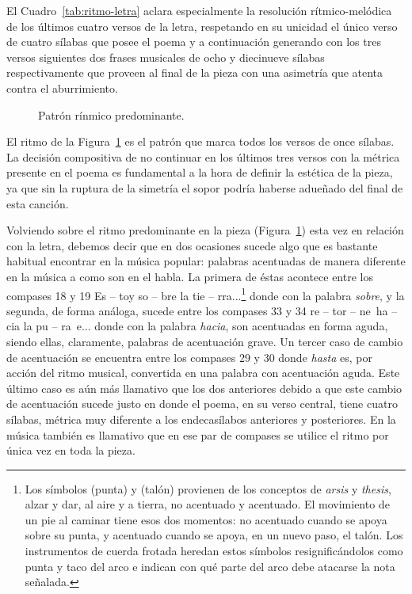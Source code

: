 El Cuadro~\ref{tab:ritmo-letra} aclara especialmente la resolución rítmico-melódica de los últimos cuatro versos de la letra, respetando en su unicidad el único verso de cuatro sílabas que posee el poema y a continuación generando con los tres versos siguientes dos frases musicales de ocho y diecinueve sílabas respectivamente que proveen al final de la pieza con una asimetría que atenta contra el aburrimiento.

\begin{figure}[H]
\centering
{}
\caption{Patrón rínmico predominante.}
\label{fig:patron-ritmico}
\end{figure}

El ritmo de la Figura~\ref{fig:patron-ritmico} es el patrón que marca todos los versos de once sílabas. La decisión compositiva de no continuar en los últimos tres versos con la métrica presente en el poema es fundamental a la hora de definir la estética de la pieza, ya que sin la ruptura de la simetría el sopor podría haberse adueñado del final de esta canción.

Volviendo sobre el ritmo predominante en la pieza (Figura~\ref{fig:patron-ritmico}) esta vez en relación con la letra, debemos decir que en dos ocasiones sucede algo que es bastante habitual encontrar en la música popular: palabras acentuadas de manera diferente en la música a como son en el habla. La primera de éstas acontece entre los compases 18 y 19  {Es -- toy so -- bre la tie -- rra...}\footnote{Los símbolos  (punta) y  (talón) provienen de los conceptos de \emph{arsis} y \emph{thesis}, alzar y dar, al aire y a tierra, no acentuado y acentuado. El movimiento de un pie al caminar tiene esos dos momentos: no acentuado cuando se apoya sobre su punta, y acentuado cuando se apoya, en un nuevo paso, el talón. Los instrumentos de cuerda frotada heredan estos símbolos resignificándolos como punta y taco del arco e indican con qué parte del arco debe atacarse la nota señalada.} donde con la palabra \emph{sobre}, y la segunda, de forma análoga, sucede entre los compases 33 y 34  {re -- tor -- ne~ha -- cia la pu -- ra~e...} donde con la palabra \emph{hacia}, son acentuadas en forma aguda, siendo ellas, claramente, palabras de acentuación grave. Un tercer caso de cambio de acentuación se encuentra entre los compases 29 y 30  donde \emph{hasta} es, por acción del ritmo musical, convertida en una palabra con acentuación aguda. Este último caso es aún más llamativo que los dos anteriores debido a que este cambio de acentuación sucede justo en donde el poema, en su verso central, tiene cuatro sílabas, métrica muy diferente a los endecasílabos anteriores y posteriores. En la música también es llamativo que en ese par de compases se utilice el ritmo  por única vez en toda la pieza.

